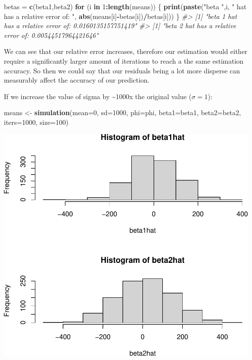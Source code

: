 \documentclass[]{article}
\newenvironment{Shaded}{\begin{snugshade}}{\end{snugshade}}
\newcommand{\CommentTok}[1]{\textcolor[rgb]{0.56,0.35,0.01}{\textit{#1}}}
\newcommand{\ControlFlowTok}[1]{\textcolor[rgb]{0.13,0.29,0.53}{\textbf{#1}}}
\newcommand{\DataTypeTok}[1]{\textcolor[rgb]{0.13,0.29,0.53}{#1}}
\newcommand{\DecValTok}[1]{\textcolor[rgb]{0.00,0.00,0.81}{#1}}
\newcommand{\KeywordTok}[1]{\textcolor[rgb]{0.13,0.29,0.53}{\textbf{#1}}}
\newcommand{\NormalTok}[1]{#1}
\newcommand{\OperatorTok}[1]{\textcolor[rgb]{0.81,0.36,0.00}{\textbf{#1}}}
\newcommand{\StringTok}[1]{\textcolor[rgb]{0.31,0.60,0.02}{#1}}
\begin{document}
\begin{Shaded}
\begin{Highlighting}[]
\NormalTok{betas =}\StringTok{ }\KeywordTok{c}\NormalTok{(beta1,beta2)}
\ControlFlowTok{for}\NormalTok{ (i }\ControlFlowTok{in} \DecValTok{1}\OperatorTok{:}\KeywordTok{length}\NormalTok{(means)) \{}
    \KeywordTok{print}\NormalTok{(}\KeywordTok{paste}\NormalTok{(}\StringTok{"beta "}\NormalTok{,i, }\StringTok{" hat has a relative error of: "}\NormalTok{, }\KeywordTok{abs}\NormalTok{(means[i]}\OperatorTok{-}\NormalTok{betas[i])}\OperatorTok{/}\NormalTok{betas[i]))}
\NormalTok{\}}
\CommentTok{#> [1] "beta  1  hat has a relative error of:  0.0160135157751419"}
\CommentTok{#> [1] "beta  2  hat has a relative error of:  0.00544517964421646"}
\end{Highlighting}
\end{Shaded}

We can see that our relative error increases, therefore our estimation
would either require a significantly larger amount of iterations to
reach a the same estimation accuracy. So then we could say that our
residuals being a lot more disperse can measurably affect the accuracy
of our prediction.

\newpage

If we increase the value of sigma by \textasciitilde{}1000x the original
value (\(\sigma = 1\)):

\begin{Shaded}
\begin{Highlighting}[]
\NormalTok{means <-}\StringTok{ }\KeywordTok{simulation}\NormalTok{(}\DataTypeTok{mean=}\DecValTok{0}\NormalTok{, }\DataTypeTok{sd=}\DecValTok{1000}\NormalTok{, }\DataTypeTok{phi=}\NormalTok{phi, }\DataTypeTok{beta1=}\NormalTok{beta1, }\DataTypeTok{beta2=}\NormalTok{beta2, }\DataTypeTok{iters=}\DecValTok{1000}\NormalTok{, }\DataTypeTok{size=}\DecValTok{100}\NormalTok{)}
\end{Highlighting}
\end{Shaded}

\includegraphics{./figures/unnamed-chunk-10-1.pdf}
\end{document}
